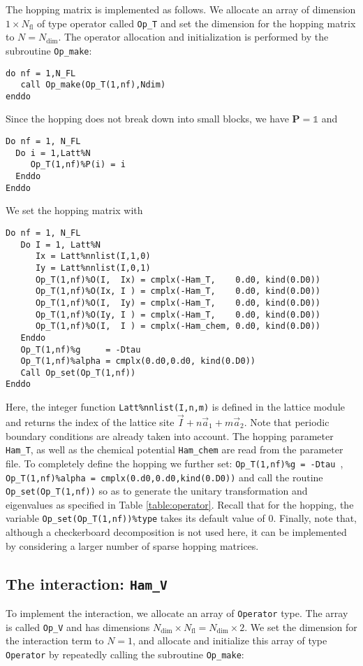 The hopping matrix is implemented as follows.
We allocate an array of dimension $1\times N_{\mathrm{fl}}$ of type operator  called \texttt{Op\_T} and set the  dimension for the hopping  matrix to $N=N_{\mathrm{dim}}$. The operator allocation and initialization is performed by the subroutine \texttt{Op\_make}:
\begin{lstlisting}[style=fortran]
do nf = 1,N_FL
   call Op_make(Op_T(1,nf),Ndim)
enddo
\end{lstlisting}
Since the hopping  does not  break down into small blocks, we have ${\bm P}=\mathds{1}$   and  
\begin{lstlisting}[style=fortran]
Do nf = 1, N_FL
  Do i = 1,Latt%N
     Op_T(1,nf)%P(i) = i
  Enddo
Enddo
\end{lstlisting}
We set the hopping matrix  with 
\begin{lstlisting}[style=fortran]
Do nf = 1, N_FL
   Do I = 1, Latt%N
      Ix = Latt%nnlist(I,1,0)
      Iy = Latt%nnlist(I,0,1)
      Op_T(1,nf)%O(I,  Ix) = cmplx(-Ham_T,    0.d0, kind(0.D0))
      Op_T(1,nf)%O(Ix, I ) = cmplx(-Ham_T,    0.d0, kind(0.D0))
      Op_T(1,nf)%O(I,  Iy) = cmplx(-Ham_T,    0.d0, kind(0.D0))
      Op_T(1,nf)%O(Iy, I ) = cmplx(-Ham_T,    0.d0, kind(0.D0))
      Op_T(1,nf)%O(I,  I ) = cmplx(-Ham_chem, 0.d0, kind(0.D0))
   Enddo
   Op_T(1,nf)%g     = -Dtau
   Op_T(1,nf)%alpha = cmplx(0.d0,0.d0, kind(0.D0))
   Call Op_set(Op_T(1,nf))
Enddo
\end{lstlisting}
Here, the integer function \texttt{Latt\%nnlist(I,n,m)} is defined in the lattice module and returns the index of the lattice site $ \vec{I} +  n \vec{a}_1 +  m \vec{a}_2$.
Note that periodic boundary conditions are 
already taken into account.  The hopping parameter \texttt{Ham\_T}, as well as the chemical potential \texttt{Ham\_chem} are read from the parameter file.  
To completely define the hopping  we further set: \texttt{Op\_T(1,nf)\%g = -Dtau }, \texttt{Op\_T(1,nf)\%alpha = cmplx(0.d0,0.d0,kind(0.D0))} and call the routine  \texttt{Op\_set(Op\_T(1,nf))}  so as to generate  the unitary transformation and eigenvalues as specified in Table \ref{table:operator}.  Recall that for the hopping, the variable  \texttt{Op\_set(Op\_T(1,nf))\%type}  takes its default value of 0.  
Finally, note that, although a checkerboard decomposition is not used here, it can be implemented by considering a larger number of sparse hopping matrices.  


\subsection{The interaction: \texttt{Ham\_V}}\label{U_PV_Ham_V} 
To implement  the interaction, we allocate an array of \texttt{Operator} type. The array is called  \texttt{Op\_V} and has dimensions $N_{\mathrm{dim}}\times N_{\mathrm{fl}}=N_{\mathrm{dim}} \times 2$. 
We set the dimension for the interaction term to  $N=1$, and  allocate and initialize this array of type  \texttt{Operator} by repeatedly calling the subroutine \texttt{Op\_make}: 

